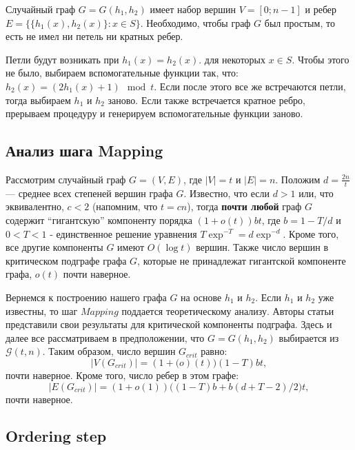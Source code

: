 \documentclass[specialist,
               substylefile = spbu.rtx,
               subf,href,colorlinks=true, 12pt]{disser}
\begin{document}
Случайный граф $G = G(h_1, h_2)$ имеет набор вершин $V = [0;n - 1]$ и ребер $E = \{\{h_1(x),h_2(x)\}: x \in S\}$. Необходимо, чтобы граф $G$ был простым, то есть не имел ни петель ни кратных ребер.

Петли будут возникать при $h_1(x) = h_2(x)$. для некоторых $x \in S$. Чтобы этого не было, выбираем вспомогательные функции так, что: $h_2(x) = (2h_1(x) + 1)\mod t$. Если после этого все же встречаются петли, тогда выбираем $h_1$ и $h_2$ заново. Если также встречается кратное ребро, прерываем процедуру и генерируем вспомогательные функции заново.

\subsection{Анализ шага Mapping} \label{sec:mapan}

Рассмотрим случайный граф $G = (V,E)$, где $|V| = t$ и $|E| = n$. Положим $d = \frac{2n}{t}$ --- среднее всех степеней вершин графа $G$. Известно, что если $d > 1$ или, что эквивалентно, $c < 2$ (напомним, что $t = cn$), тогда \textbf{почти любой} граф $G$ содержит ``гигантскую'' компоненту порядка $(1+\mathit{o}(t))bt$, где $b = 1 - T/d$ и $0 < T < 1$ - единственное решение уравнения $T\exp^{-T} = d\exp^{-d}$. Кроме того, все другие компоненты $G$ имеют $\mathit{O}(\log t)$ вершин. Также число вершин в критическом подграфе графа $G$, которые не принадлежат гигантской компоненте графа, $\mathit{o}(t)$ почти наверное.

Вернемся к построению нашего графа $G$ на основе $h_1$ и $h_2$. Если $h_1$ и $h_2$ уже известны, то шаг $Mapping$ поддается теоретическому анализу. Авторы статьи представили свои результаты для критической компоненты подграфа. Здесь и далее все рассматриваем в предположении, что $G = G(h_1,h_2)$ выбирается из $\mathcal{G}(t,n)$. Таким образом, число вершин $G_{crit}$ равно:
%
\begin{equation}\label{eq1}
|V(G_{crit})| = (1+\mathit(o)(t))(1 - T)bt,
\end{equation}
%
почти наверное. Кроме того, число ребер в этом графе:
%
\begin{equation}\label{eq2}
|E(G_{crit})| = (1+\mathit{o}(1))\Big((1-T)b + b(d + T - 2)/2\Big)t,
\end{equation}
%
почти наверное. 

\newpage

\subsection{Ordering step}
\end{document}
